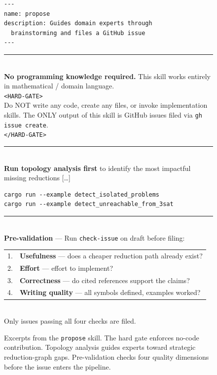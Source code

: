 \documentclass[conference]{IEEEtran}
\begin{document}
\begin{figure}[t]
  \centering
  \begin{tcolorbox}[
    colback=gray!5, colframe=gray!80,
    title={\textbf{\texttt{propose}} --- advisor skill (excerpts)},
    fonttitle=\footnotesize, boxrule=0.4pt, arc=2pt, left=4pt, right=4pt, top=2pt, bottom=2pt
  ]
  \footnotesize
  \begin{lstlisting}[basicstyle=\ttfamily\footnotesize, numbers=none, frame=none, aboveskip=0pt, belowskip=0pt, xleftmargin=4pt]
---
name: propose
description: Guides domain experts through
  brainstorming and files a GitHub issue
---
  \end{lstlisting}
  \vspace{-4pt}
  \rule{\linewidth}{0.3pt}\\[3pt]
  \textbf{No programming knowledge required.}
  This skill works entirely in mathematical / domain language.\\[3pt]
  \texttt{<HARD-GATE>}\\
  Do NOT write any code, create any files, or invoke implementation skills.
  The ONLY output of this skill is GitHub issues filed via \texttt{gh issue create}.\\
  \texttt{</HARD-GATE>}\\[3pt]
  \rule{\linewidth}{0.3pt}\\[3pt]
  \textbf{Run topology analysis first} to identify the most impactful missing reductions [\ldots]\\
  \begin{lstlisting}[basicstyle=\ttfamily\footnotesize, numbers=none, frame=none, aboveskip=-5pt, belowskip=2pt, xleftmargin=4pt]
cargo run --example detect_isolated_problems
cargo run --example detect_unreachable_from_3sat
  \end{lstlisting}
  \vspace{-2pt}
  \rule{\linewidth}{0.3pt}\\[3pt]
  \textbf{Pre-validation} --- Run \texttt{check-issue} on draft before filing:\\[2pt]
  \begin{tabular}{@{}r@{~}l@{}}
    1. & \textbf{Usefulness} --- does a cheaper reduction path already exist? \\
    2. & \textbf{Effort} --- effort to implement? \\
    3. & \textbf{Correctness} --- do cited references support the claims? \\
    4. & \textbf{Writing quality} --- all symbols defined, examples worked? \\
  \end{tabular}\\[2pt]
  Only issues passing all four checks are filed.
  \end{tcolorbox}
  \caption{Excerpts from the \texttt{propose} skill.
    The hard gate enforces no-code contribution.
    Topology analysis guides experts toward strategic reduction-graph gaps.
    Pre-validation checks four quality dimensions before the issue enters the pipeline.}
  \label{fig:skill-propose}
\end{figure}
\end{document}
